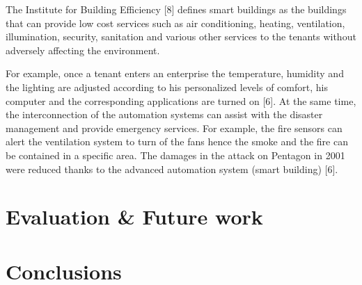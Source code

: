 \documentclass[conference]{IEEEtran}
\begin{document}
The Institute for Building Efficiency [8] defines smart buildings
as the buildings that can provide low cost services such
as air conditioning, heating, ventilation, illumination, security,
sanitation and various other services to the tenants without
adversely affecting the environment.

For example, once a tenant
enters an enterprise the temperature, humidity and the lighting
are adjusted according to his personalized levels of comfort,
his computer and the corresponding applications are turned on
[6]. At the same time, the interconnection of the automation
systems can assist with the disaster management and provide
emergency services. For example, the fire sensors can alert
the ventilation system to turn of the fans hence the smoke and
the fire can be contained in a specific area. The damages in
the attack on Pentagon in 2001 were reduced thanks to the
advanced automation system (smart building) [6].

\section{Evaluation \& Future work   }


\section{Conclusions  }
\end{document}

